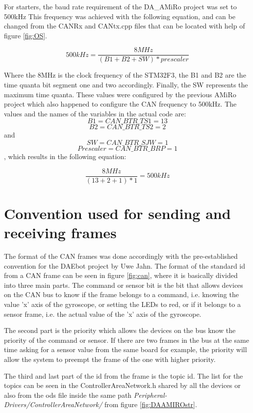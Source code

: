 \documentclass[12pt]{report}%
\begin{document}
For starters, the baud rate requirement of the DA\_AMiRo project was set to 500kHz This frequency was achieved with the following equation, and can be changed from the CANRx and CANtx.cpp files that can be located with help of figure \ref{fig:OS}.

\begin{equation} \label{eq:baudrate1}
	500kHz= \frac{8MHz}{(B1+B2+SW)*prescaler}
\end{equation}

Where the 8MHz is the clock frequency of the STM32F3, the B1 and B2 are the time quanta bit segment one and two accordingly. Finally, the SW represents the maximum time quanta. These values were configured by the previous AMiRo project which also happened to configure the CAN frequency to 500kHz. The values and the names of the variables in the actual code are: $$B1 = CAN\_BTR\_TS1 = 13$$ $$B2 = CAN\_BTR\_TS2 = 2$$ and $$SW = CAN\_BTR\_SJW = 1$$ $$Prescaler = CAN\_BTR\_BRP = 1$$, which results in the following equation:

\begin{equation} \label{eq:baudrate2}
	\frac{8MHz}{(13+2+1)*1} = 500kHz
\end{equation}

\section{Convention used for sending and receiving frames}
\label{sec:canconv}

The format of the CAN frames was done accordingly with the pre-established convention for the DAEbot project \cite{DAEbot_Wiki} by Uwe Jahn. The format of the standard id from a CAN frame can be seen in figure \ref{fig:can}, where it is basically divided into three main parts. The command or sensor bit is the bit that allows devices on the CAN bus to know if the frame belongs to a command, i.e. knowing the value 'x' axis of the gyroscope, or setting the LEDs to red, or if it belongs to a sensor frame, i.e. the actual value of the 'x' axis of the gyroscope.

The second part is the priority which allows the devices on the bus know the priority of the command or sensor. If there are two frames in the bus at the same time asking for a sensor value from the same board for example, the priority will allow the system to preempt the frame of the one with higher priority.

The third and last part of the id from the frame is the topic id. The list for the topics can be seen in the ControllerAreaNetwork.h shared by all the devices or also from the ods file inside the same path \textit{Peripheral-Drivers/ControllerAreaNetwork/} from figure \ref{fig:DAAMIROstr}.
\end{document}
